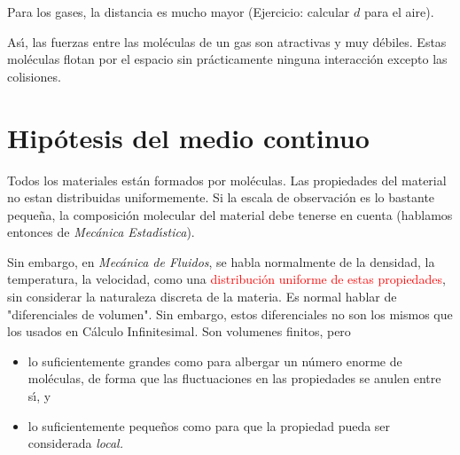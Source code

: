 Para los gases, la distancia es mucho mayor (Ejercicio: calcular $d$ para el aire).

As\'{\i}, las fuerzas entre las mol\'eculas de un gas son atractivas y muy d\'ebiles. Estas mol\'eculas
flotan por el espacio sin pr\'acticamente ninguna interacci\'on excepto las colisiones.

\section{Hipótesis del medio continuo}

Todos los materiales est\'an formados por mol\'eculas. Las propiedades del material no estan distribuidas
uniformemente. Si la escala de observaci\'on es lo bastante peque\~na, la composici\'on molecular del material
debe tenerse en cuenta (hablamos entonces de {\em Mec\'anica Estad\'{\i}stica}).

Sin embargo, en {\em Mec\'anica de Fluidos}, se habla normalmente de la densidad, la temperatura, la velocidad,
como una \textcolor{red}{distribuci\'on uniforme de estas propiedades}, sin considerar la naturaleza discreta de la materia. Es
normal hablar de "diferenciales de volumen". Sin embargo, estos diferenciales no son los mismos que los usados
en C\'alculo Infinitesimal. Son volumenes finitos, pero

\begin{itemize}
	\item lo suficientemente grandes como para albergar un n\'umero enorme de mol\'eculas, de forma que las fluctuaciones en las propiedades se anulen entre s\'{\i}, y
	\item lo suficientemente peque\~nos como para que la propiedad pueda ser considerada \em{local}.
\end{itemize}

